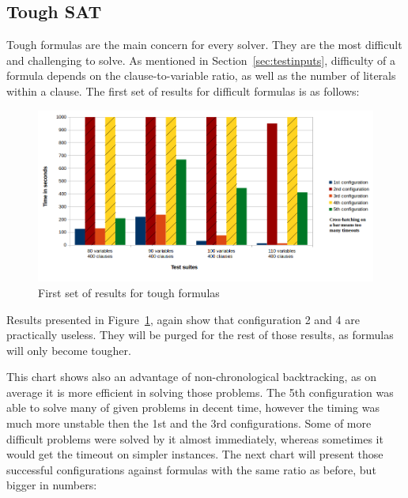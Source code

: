 \documentclass[12pt,english,pdflatex]{aghdpl}
\begin{document}
\subsection{Tough SAT}
\label{subsec:ToughSat}
Tough formulas are the main concern for every solver. They are the most difficult and challenging to solve. As mentioned in Section~\ref{sec:testinputs}, difficulty of a formula depends on the clause-to-variable ratio, as well as the number of literals within a clause. The first set of results for difficult formulas is as follows:

\begin{figure}[H]
\begin{centering}
\includegraphics[scale=0.62]{charts/diff_sat_1}
\par\end{centering}
\caption{First set of results for tough formulas}
\label{fig:diffsat1}
\end{figure}

Results presented in Figure~\ref{fig:diffsat1}, again show that configuration 2 and 4 are practically useless. They will be purged for the rest of those results, as formulas will only become tougher.

This chart shows also an advantage of non-chronological backtracking, as on average it is more efficient in solving those problems. The 5th configuration was able to solve many of given problems in decent time, however the timing was much more unstable then the 1st and the 3rd configurations. Some of more difficult problems were solved by it almost immediately, whereas sometimes it would get the timeout on simpler instances. The next chart will present those successful configurations against formulas with the same ratio as before, but bigger in numbers:
\end{document}
